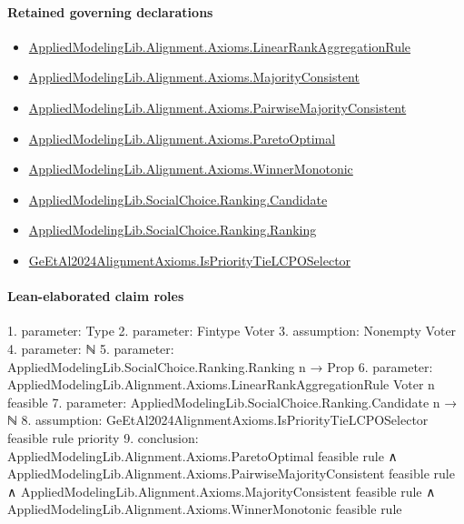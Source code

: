 \documentclass[10pt]{article}
\begin{document}
\paragraph{Retained governing declarations}
\begin{itemize}\raggedright
\item \hyperlink{library-prerequisite-43447e121a1884f9}{Applied\allowbreak{}Modeling\allowbreak{}Lib.\allowbreak{}Alignment.\allowbreak{}Axioms.\allowbreak{}Linear\allowbreak{}Rank\allowbreak{}Aggregation\allowbreak{}Rule}
\item \hyperlink{library-prerequisite-5d6a6008c423d214}{Applied\allowbreak{}Modeling\allowbreak{}Lib.\allowbreak{}Alignment.\allowbreak{}Axioms.\allowbreak{}Majority\allowbreak{}Consistent}
\item \hyperlink{library-prerequisite-e6dee3706881b80a}{Applied\allowbreak{}Modeling\allowbreak{}Lib.\allowbreak{}Alignment.\allowbreak{}Axioms.\allowbreak{}Pairwise\allowbreak{}Majority\allowbreak{}Consistent}
\item \hyperlink{library-prerequisite-80fdf9d21d096dc8}{Applied\allowbreak{}Modeling\allowbreak{}Lib.\allowbreak{}Alignment.\allowbreak{}Axioms.\allowbreak{}Pareto\allowbreak{}Optimal}
\item \hyperlink{library-prerequisite-2a43c1465e4fa011}{Applied\allowbreak{}Modeling\allowbreak{}Lib.\allowbreak{}Alignment.\allowbreak{}Axioms.\allowbreak{}Winner\allowbreak{}Monotonic}
\item \hyperlink{library-prerequisite-8c0e6c25845ae78a}{Applied\allowbreak{}Modeling\allowbreak{}Lib.\allowbreak{}Social\allowbreak{}Choice.\allowbreak{}Ranking.\allowbreak{}Candidate}
\item \hyperlink{library-prerequisite-5cde54446d1ae021}{Applied\allowbreak{}Modeling\allowbreak{}Lib.\allowbreak{}Social\allowbreak{}Choice.\allowbreak{}Ranking.\allowbreak{}Ranking}
\item \hyperlink{governing-declaration-b7db990092b0edb0}{Ge\allowbreak{}Et\allowbreak{}Al2024\allowbreak{}Alignment\allowbreak{}Axioms.\allowbreak{}Is\allowbreak{}Priority\allowbreak{}Tie\allowbreak{}LCPO\allowbreak{}Selector}
\end{itemize}
\paragraph{Lean-elaborated claim roles}\begin{ReviewVerbatim}
1. parameter: Type
2. parameter: Fintype Voter
3. assumption: Nonempty Voter
4. parameter: ℕ
5. parameter: AppliedModelingLib.SocialChoice.Ranking.Ranking n → Prop
6. parameter: AppliedModelingLib.Alignment.Axioms.LinearRankAggregationRule Voter n feasible
7. parameter: AppliedModelingLib.SocialChoice.Ranking.Candidate n → ℕ
8. assumption: GeEtAl2024AlignmentAxioms.IsPriorityTieLCPOSelector feasible rule priority
9. conclusion: AppliedModelingLib.Alignment.Axioms.ParetoOptimal feasible rule ∧
  AppliedModelingLib.Alignment.Axioms.PairwiseMajorityConsistent feasible rule ∧
    AppliedModelingLib.Alignment.Axioms.MajorityConsistent feasible rule ∧
      AppliedModelingLib.Alignment.Axioms.WinnerMonotonic feasible rule
\end{ReviewVerbatim}
\end{document}
